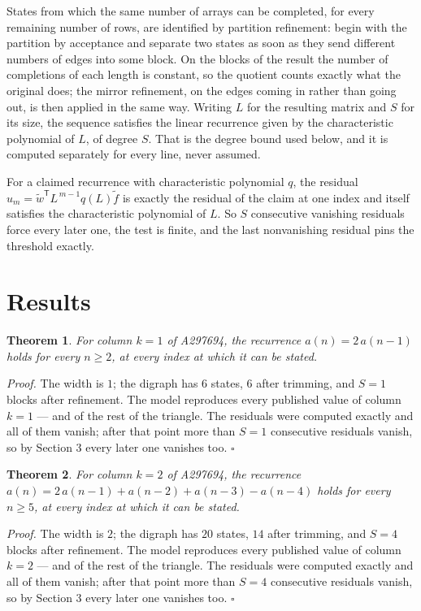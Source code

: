 \documentclass[11pt]{article}
\newtheorem{theorem}{Theorem}
\theoremstyle{definition}
\begin{document}
States from which the same number of arrays can be completed, for every remaining number of rows, are identified by partition refinement: begin with the partition by acceptance and separate two states as soon as they send different numbers of edges into some block. On the blocks of the result the number of completions of each length is constant, so the quotient counts exactly what the original does; the mirror refinement, on the edges coming in rather than going out, is then applied in the same way. Writing $L$ for the resulting matrix and $S$ for its size, the sequence satisfies the linear recurrence given by the characteristic polynomial of $L$, of degree $S$. That is the degree bound used below, and it is computed separately for every line, never assumed.

For a claimed recurrence with characteristic polynomial $q$, the residual $u_m = \tilde w^{\mathsf T}L^{\,m-1}q(L)\tilde f$ is exactly the residual of the claim at one index and itself satisfies the characteristic polynomial of $L$. So $S$ consecutive vanishing residuals force every later one, the test is finite, and the last nonvanishing residual pins the threshold exactly.

\section{Results}

\begin{theorem} For column $k = 1$ of A297694, the recurrence $a(n) = 2\,a(n-1)$ holds for every $n \ge 2$, at every index at which it can be stated.\end{theorem}

{\itshape Proof.} The width is $1$; the digraph has $6$ states, $6$ after trimming, and $S = 1$ blocks after refinement. The model reproduces every published value of column $k = 1$ --- and of the rest of the triangle. The residuals were computed exactly and all of them vanish; after that point more than $S = 1$ consecutive residuals vanish, so by Section 3 every later one vanishes too. $\square$

\begin{theorem} For column $k = 2$ of A297694, the recurrence $a(n) = 2\,a(n-1) + a(n-2) + a(n-3) - a(n-4)$ holds for every $n \ge 5$, at every index at which it can be stated.\end{theorem}

{\itshape Proof.} The width is $2$; the digraph has $20$ states, $14$ after trimming, and $S = 4$ blocks after refinement. The model reproduces every published value of column $k = 2$ --- and of the rest of the triangle. The residuals were computed exactly and all of them vanish; after that point more than $S = 4$ consecutive residuals vanish, so by Section 3 every later one vanishes too. $\square$
\end{document}
